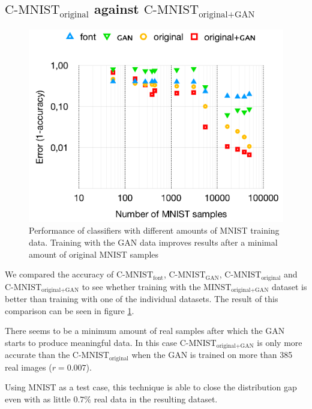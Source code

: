 \documentclass[10pt,twocolumn,letterpaper]{article}
\begin{document}
\subsection{$\text{C-MNIST}_\text{original}$ against $\text{C-MNIST}_\text{original+GAN}$}
\begin{figure}[h]
\begin{center}
	\includegraphics[width=0.9\linewidth]{../graph-results.png}
\end{center}
   \caption{Performance of classifiers with different amounts of MNIST training data. Training with the GAN data improves results after a minimal amount of original MNIST samples}
\label{fig:graph-results}
\end{figure}


We compared the accuracy of $\text{C-MNIST}_\text{font}$, $\text{C-MNIST}_\text{GAN}$, $\text{C-MNIST}_\text{original}$ and $\text{C-MNIST}_\text{original+GAN}$ to see whether training with the $\text{MINST}_\text{original+GAN}$ dataset is better than training with one of the individual datasets. The result of this comparison can be seen in figure \ref{fig:graph-results}.


There seems to be a minimum amount of real samples after which the GAN starts to produce meaningful data. In this case $\text{C-MNIST}_\text{original+GAN}$ is only more accurate than the $\text{C-MNIST}_\text{original}$ when the GAN is trained on more than 385 real images ($r = 0.007$).


Using MNIST as a test case, this technique is able to close the distribution gap even with as little $0.7\%$ real data in the resulting dataset.
\end{document}
